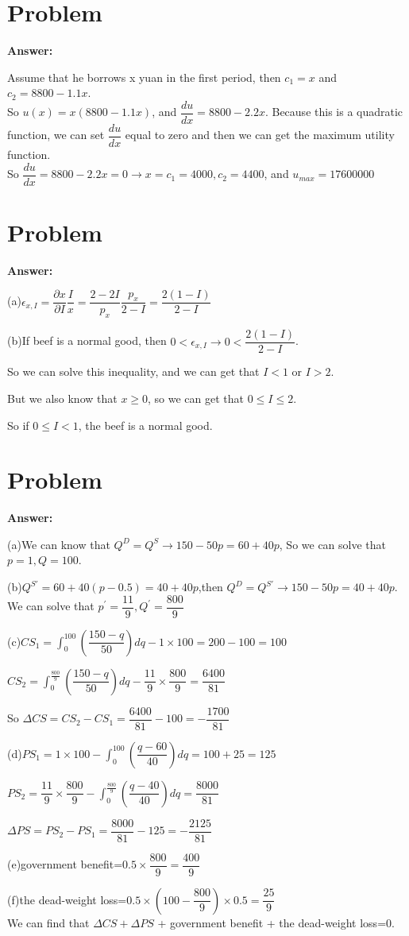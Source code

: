 \documentclass[a4 paper,12pt]{article}
\begin{document}
\section{Problem}
\noindent
\textbf{Answer:}
\par Assume that he borrows x yuan in the first period, then $c_{1}=x$ and $c_{2}=8800-1.1x$.\\
So $u(x)=x(8800-1.1x)$, and $\dfrac{du}{dx}=8800-2.2x$. Because this is a quadratic function, we can set $\dfrac{du}{dx}$ equal to zero and then we can get the maximum utility function.\\
So $\dfrac{du}{dx}=8800-2.2x=0\rightarrow x=c_{1}=4000,c_{2}=4400$, and $u_{max}=17600000$
\section{Problem}
\noindent
\textbf{Answer:}
\par (a)$\epsilon_{x,I}=\dfrac{\partial x}{\partial I}\dfrac{I}{x}=\dfrac{2-2I}{p_{x}}\dfrac{p_{x}}{2-I}=\dfrac{2(1-I)}{2-I}$
\par (b)If beef is a normal good, then $0<\epsilon_{x,I}\rightarrow 0<\dfrac{2(1-I)}{2-I}$.
\par So we can solve this inequality, and we can get that $I<1$ or $I>2$.
\par But we also know that $x\ge 0$, so we can get that $0\le I\le 2$.
\par So if $0\le I<1$, the beef is a normal good.
\section{Problem}
\noindent
\textbf{Answer:}
\par (a)We can know that $Q^{D}=Q^{S}\rightarrow 150-50p=60+40p$, So we can solve that $p=1,Q=100$.
\par (b)$Q^{S\prime}=60+40(p-0.5)=40+40p$,then $Q^{D}=Q^{S\prime}\rightarrow 150-50p=40+40p$.\\
We can solve that $p^{\prime}=\dfrac{11}{9},Q^{\prime}=\dfrac{800}{9}$
\par(c)$CS_{1}=\int_{0}^{100}(\dfrac{150-q}{50})dq-1\times 100=200-100=100$
\par $CS_{2}=\int_{0}^{\frac{800}{9}}(\dfrac{150-q}{50})dq-\dfrac{11}{9}\times \dfrac{800}{9}=\dfrac{6400}{81}$
\par So $\Delta CS=CS_{2}-CS_{1}=\dfrac{6400}{81}-100=-\dfrac{1700}{81}$
\par (d)$PS_{1}=1\times 100-\int_{0}^{100}(\dfrac{q-60}{40})dq=100+25=125$
\par $PS_{2}=\dfrac{11}{9}\times \dfrac{800}{9}-\int_{0}^{\frac{800}{9}}(\dfrac{q-40}{40})dq=\dfrac{8000}{81}$
\par $\Delta PS=PS_{2}-PS_{1}=\dfrac{8000}{81}-125=-\dfrac{2125}{81}$
\par (e)government benefit=$0.5\times \dfrac{800}{9}=\dfrac{400}{9}$
\par(f)the dead-weight loss=$0.5\times (100-\dfrac{800}{9})\times 0.5=\dfrac{25}{9}$\\
We can find that $\Delta CS+\Delta PS$ + government benefit + the dead-weight loss=0.
\end{document}
